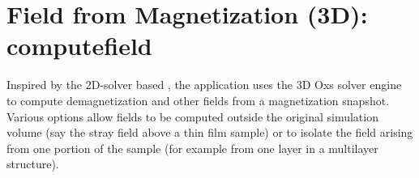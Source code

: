
\section{Field from Magnetization (3D):
            computefield}\label{sec:computefield}%
%
%

Inspired by the 2D-solver based
, the
 application uses the
3D Oxs solver engine to compute demagnetization and other fields from a
magnetization snapshot. Various options allow fields to be computed
outside the original simulation volume (say the stray field above a thin
film sample) or to isolate the field arising from one portion of the
sample (for example from one layer in a multilayer structure).

